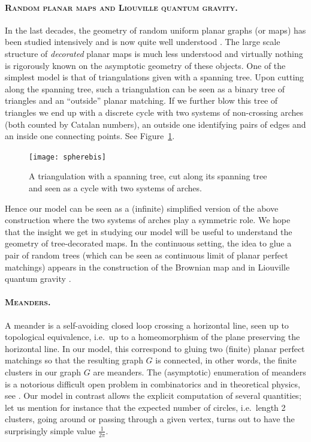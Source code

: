 \documentclass[12pt]{amsart}
\theoremstyle{remark}
\begin{document}
\paragraph{\textsc{Random planar maps and Liouville quantum gravity}.}  In the last decades, the geometry of random uniform planar graphs (or maps) has been studied intensively and is now quite well understood \cite{LeGallICM}. The large scale structure of \emph{decorated} planar maps is much less understood and virtually nothing is rigorously known on the asymptotic geometry of these objects. One of the simplest model is that of triangulations given with a spanning tree. Upon cutting along the spanning tree, such a triangulation can be seen as a binary tree of triangles and an ``outside'' planar matching. If we further blow this tree of triangles we end up with a discrete cycle with two systems of non-crossing arches (both counted by Catalan numbers), an outside one identifying pairs of edges and an inside one connecting points. See Figure~\ref{fig:trig}. 

\begin{figure}[!h]
 \begin{center}
 \texttt{[image: spherebis]}

 \caption{ \label{fig:trig} A triangulation with a spanning tree, cut along its spanning tree and seen as a cycle with two systems of arches.}
 \end{center}
 \end{figure}
 
 Hence our model can be seen as a (infinite) simplified version of the above construction where the two systems of arches play a symmetric role. We hope that the insight we get in studying our model will be useful to understand the geometry of tree-decorated maps. In the continuous setting, the idea  to glue a pair of random trees (which can be seen as continuous limit of planar perfect matchings) appears in the construction of the Brownian map \cite{MM06,LG07} and in Liouville quantum gravity \cite{SheHC,DMSgluingoftrees}.

\medskip
\paragraph{\textsc{Meanders}.} A meander is a self-avoiding closed loop crossing a horizontal line, seen up to topological equivalence, i.e.\ up to a homeomorphism of the plane preserving the horizontal line. In our model, this correspond to gluing two (finite) planar perfect matchings so that the resulting graph $G$ is connected, in other words, the finite clusters in our graph $G$ are meanders. The (asymptotic) enumeration of meanders is a notorious difficult open problem in combinatorics and in theoretical physics, see \cite{GuiHDR}. Our model in contrast allows the explicit computation of several quantities; let us mention for instance that the expected number of circles, i.e.~length 2 clusters, going around or passing through a given vertex, turns out to have the surprisingly simple value $\frac1{2\pi}$. 
\end{document}

